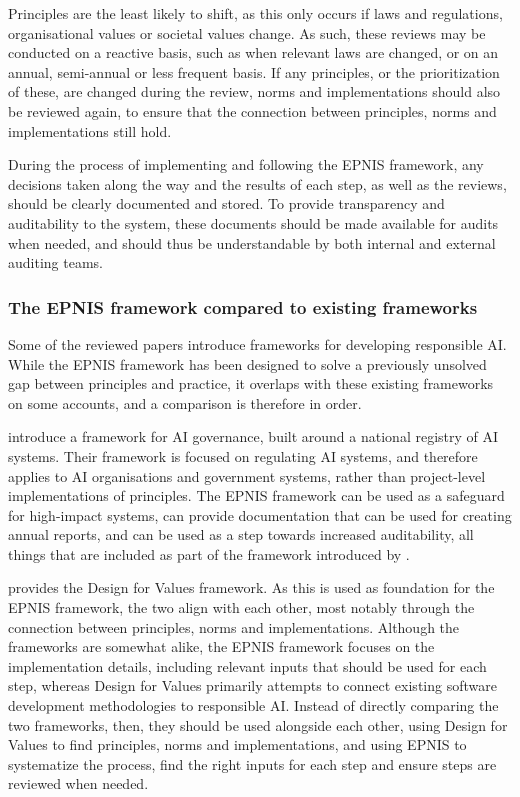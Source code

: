 Principles are the least likely to shift, as this only occurs if laws and regulations, organisational values or societal values change. As such, these reviews may be conducted on a reactive basis, such as when relevant laws are changed, or on an annual, semi-annual or less frequent basis. If any principles, or the prioritization of these, are changed during the review, norms and implementations should also be reviewed again, to ensure that the connection between principles, norms and implementations still hold.

During the process of implementing and following the EPNIS framework, any decisions taken along the way and the results of each step, as well as the reviews, should be clearly documented and stored. To provide transparency and auditability to the system, these documents should be made available for audits when needed, and should thus be understandable by both internal and external auditing teams.

\subsubsection{The EPNIS framework compared to existing frameworks}
Some of the reviewed papers introduce frameworks for developing responsible AI. While the EPNIS framework has been designed to solve a previously unsolved gap between principles and practice, it overlaps with these existing frameworks on some accounts, and a comparison is therefore in order.

\textcite{Chen_2020} introduce a framework for AI governance, built around a national registry of AI systems. Their framework is focused on regulating AI systems, and therefore applies to AI organisations and government systems, rather than project-level implementations of principles. The EPNIS framework can be used as a safeguard for high-impact systems, can provide documentation that can be used for creating annual reports, and can be used as a step towards increased auditability, all things that are included as part of the framework introduced by \textcite{Chen_2020}.

\textcite{Dignum_2019} provides the Design for Values framework. As this is used as foundation for the EPNIS framework, the two align with each other, most notably through the connection between principles, norms and implementations. Although the frameworks are somewhat alike, the EPNIS framework focuses on the implementation details, including relevant inputs that should be used for each step, whereas Design for Values primarily attempts to connect existing software development methodologies to responsible AI. Instead of directly comparing the two frameworks, then, they should be used alongside each other, using Design for Values to find principles, norms and implementations, and using EPNIS to systematize the process, find the right inputs for each step and ensure steps are reviewed when needed.

